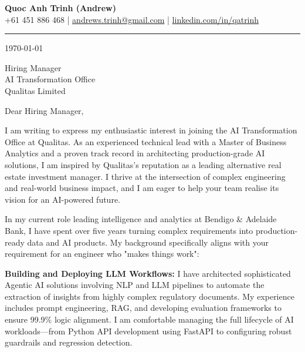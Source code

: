 \documentclass[11pt, a4paper]{article}
\begin{document}
\begin{center}
    {\LARGE \textbf{Quoc Anh Trinh (Andrew)}}\\[4pt]
    {\small
        +61 451 886 468 \quad|\quad
        \href{mailto:andrews.trinh@gmail.com}{andrews.trinh@gmail.com} \quad|\quad
        \href{https://www.linkedin.com/in/qatrinh}{linkedin.com/in/qatrinh}
    }
\end{center}

\vspace{4pt}
\hrule
\vspace{14pt}

\today

\vspace{8pt}

Hiring Manager\\
AI Transformation Office\\
Qualitas Limited

\vspace{10pt}

Dear Hiring Manager,

I am writing to express my enthusiastic interest in joining the AI Transformation Office at Qualitas. As an experienced technical lead with a Master of Business Analytics and a proven track record in architecting production-grade AI solutions, I am inspired by Qualitas’s reputation as a leading alternative real estate investment manager. I thrive at the intersection of complex engineering and real-world business impact, and I am eager to help your team realise its vision for an AI-powered future.

In my current role leading intelligence and analytics at Bendigo \& Adelaide Bank, I have spent over five years turning complex requirements into production-ready data and AI products. My background specifically aligns with your requirement for an engineer who "makes things work":

\textbf{Building and Deploying LLM Workflows:}
I have architected sophisticated Agentic AI solutions involving NLP and LLM pipelines to automate the extraction of insights from highly complex regulatory documents. My experience includes prompt engineering, RAG, and developing evaluation frameworks to ensure 99.9\% logic alignment. I am comfortable managing the full lifecycle of AI workloads—from Python API development using FastAPI to configuring robust guardrails and regression detection.
\end{document}
